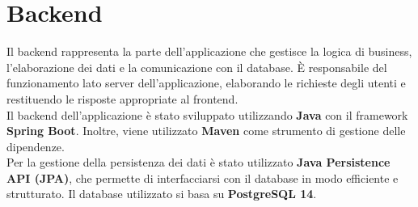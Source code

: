\section{Backend} 
Il backend rappresenta la parte dell'applicazione che gestisce la logica di business, 
l'elaborazione dei dati e la comunicazione con il database. 
È responsabile del funzionamento lato server dell'applicazione, 
elaborando le richieste degli utenti e restituendo le risposte appropriate al frontend.
\\
Il backend dell'applicazione è stato sviluppato utilizzando \textbf{Java} con il framework 
\textbf{Spring Boot}. Inoltre, viene utilizzato \textbf{Maven}
come strumento di gestione delle dipendenze. 
\\
Per la gestione della persistenza 
dei dati è stato utilizzato \textbf{Java Persistence API (JPA)}, che permette di interfacciarsi 
con il database in modo efficiente e strutturato. Il database utilizzato si basa su \textbf{PostgreSQL 14}.

